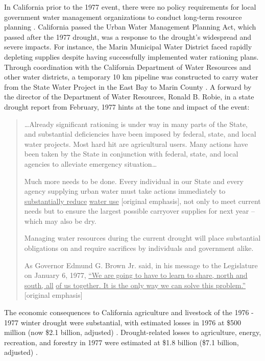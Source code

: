 \documentclass[final, double]{ua-thesis}
\begin{document}
In California prior to the 1977 event, there were no policy requirements for local government water management organizations to conduct long-term resource planning \citep{california_department_of_water_resources_2015_2016}. California passed the Urban Water Management Planning Act, which passed after the 1977 drought, was a response to the drought's widespread and severe impacts. For instance, the Marin Municipal Water District faced rapidly depleting supplies despite having successfully implemented water rationing plans. Through coordination with the California Department of Water Resources and other water districts, a temporary 10 km pipeline was constructed to carry water from the State Water Project in the East Bay to Marin County \citep{california_department_of_water_resources_2015_2016}. A forward by the director of the Department of Water Resources, Ronald B. Robie, in a state drought report from February, 1977 \citep{california_department_of_water_resources_california_1977} hints at the tone and impact of the event:
\begin{quote}
\ldots Already significant rationing is under way in many parts of the State, and substantial deficiencies have been imposed by federal, state, and local water projects. Most hard hit are agricultural users. Many actions have been taken by the State in conjunction with federal, state, and local agencies to alleviate emergency situation\ldots

Much more needs to be done. Every individual in our State and every agency supplying urban water must take actions immediately to \underline{substantially reduce} \underline{water use} [original emphasis], not only to meet current needs but to ensure the largest possible carryover supplies for next year – which may also be dry.

Managing water resources during the current drought will place substantial obligations on and require sacrifices by individuals and government alike.

As Governor Edmund G. Brown Jr. said, in his message to the Legislature on January 6, 1977, \underline{``We are going to have to learn to share, north and south, all} \underline{of us together. It is the only way we can solve this problem.''} [original emphasis]
\end{quote}

The economic consequences to California agriculture and livestock of the 1976 - 1977 winter drought were substantial, with estimated losses in 1976 at \$500 million (now \$2.1 billion, adjusted) \citep{us_government_accountability_office_california_1977}. Drought-related losses to agriculture, energy, recreation, and forestry in 1977 were estimated at \$1.8 billion (\$7.1 billion, adjusted) \citep{california_department_of_water_resources_1976_1977}.
\end{document}

